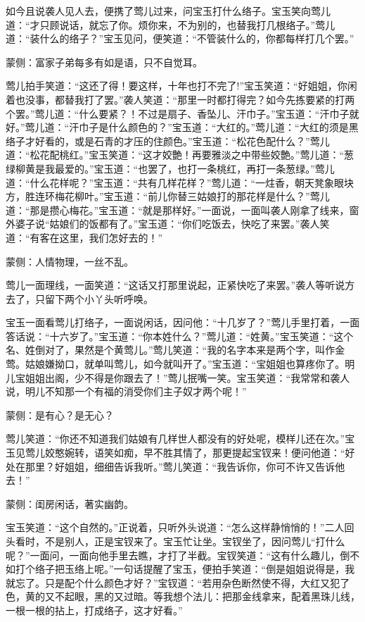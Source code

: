\begin{parag}
    如今且说袭人见人去，便携了莺儿过来，问宝玉打什么络子。宝玉笑向莺儿道：“才只顾说话，就忘了你。烦你来，不为别的，也替我打几根络子。”莺儿道：“装什么的络子？”宝玉见问，便笑道：“不管装什么的，你都每样打几个罢。”\begin{note}蒙侧：富家子弟每多有如是语，只不自觉耳。\end{note}莺儿拍手笑道：“这还了得！要这样，十年也打不完了!”宝玉笑道：“好姐姐，你闲着也没事，都替我打了罢。”袭人笑道：“那里一时都打得完？如今先拣要紧的打两个罢。”莺儿道：“什么要紧？！不过是扇子、香坠儿、汗巾子。”宝玉道：“汗巾子就好。”莺儿道：“汗巾子是什么颜色的？”宝玉道：“大红的。”莺儿道：“大红的须是黑络子才好看的，或是石青的才压的住颜色。”宝玉道：“松花色配什么？”莺儿道：“松花配桃红。”宝玉笑道：“这才姣艶！再要雅淡之中带些姣艶。”莺儿道：“葱绿柳黄是我最爱的。”宝玉道：“也罢了，也打一条桃红，再打一条葱绿。”莺儿道：“什么花样呢？”宝玉道：“共有几样花样？”莺儿道：“一炷香，朝天凳象眼块方，胜连环梅花柳叶。”宝玉道：“前儿你替三姑娘打的那花样是什么？”莺儿道：“那是攒心梅花。”宝玉道：“就是那样好。”一面说，一面叫袭人刚拿了线来，窗外婆子说“姑娘们的饭都有了。”宝玉道：“你们吃饭去，快吃了来罢。”袭人笑道：“有客在这里，我们怎好去的！”\begin{note}蒙侧：人情物理，一丝不乱。\end{note}莺儿一面理线，一面笑道：“这话又打那里说起，正紧快吃了来罢。”袭人等听说方去了，只留下两个小丫头听呼唤。
\end{parag}


\begin{parag}
    宝玉一面看莺儿打络子，一面说闲话，因问他：“十几岁了？”莺儿手里打着，一面答话说：“十六岁了。”宝玉道：“你本姓什么？”莺儿道：“姓黄。”宝玉笑道：“这个名、姓倒对了，果然是个黄莺儿。”莺儿笑道：“我的名字本来是两个字，叫作金莺。姑娘嫌拗口，就单叫莺儿，如今就叫开了。”宝玉道：“宝姐姐也算疼你了。明儿宝姐姐出阁，少不得是你跟去了！”莺儿抿嘴一笑。宝玉笑道：“我常常和袭人说，明儿不知那一个有福的消受你们主子奴才两个呢！”\begin{note}蒙侧：是有心？是无心？\end{note}莺儿笑道：“你还不知道我们姑娘有几样世人都没有的好处呢，模样儿还在次。”宝玉见莺儿姣憨婉转，语笑如痴，早不胜其情了，那更提起宝钗来！便问他道：“好处在那里？好姐姐，细细告诉我听。”莺儿笑道：“我告诉你，你可不许又告诉他去！”\begin{note}蒙侧：闺房闲话，著实幽韵。\end{note}宝玉笑道：“这个自然的。”正说着，只听外头说道：“怎么这样静悄悄的！”二人回头看时，不是别人，正是宝钗来了。宝玉忙让坐。宝钗坐了，因问莺儿“打什么呢？”一面问，一面向他手里去瞧，才打了半截。宝钗笑道：“这有什么趣儿，倒不如打个络子把玉络上呢。”一句话提醒了宝玉，便拍手笑道：“倒是姐姐说得是，我就忘了。只是配个什么颜色才好？”宝钗道：“若用杂色断然使不得，大红又犯了色，黄的又不起眼，黑的又过暗。等我想个法儿：把那金线拿来，配着黑珠儿线，一根一根的拈上，打成络子，这才好看。”
\end{parag}


